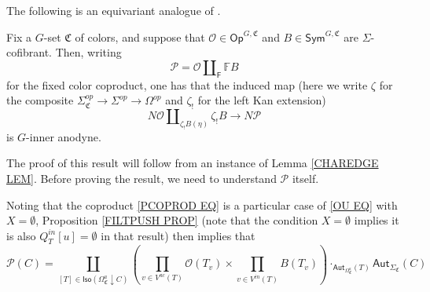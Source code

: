 \documentclass[a4paper,10pt
,draft
]{article}%
\renewcommand{\1}{\eta}%
\begin{document}
The following is an equivariant analogue of \cite[Prop. 3.2]{CM13b}.

\begin{proposition}\label{KEYPR PROP}
Fix a $G$-set $\mathfrak{C}$ of colors,
and suppose that 
$\mathcal{O} \in \mathsf{Op}^{G,\mathfrak{C}}$
and
$B \in \mathsf{Sym}^{G,\mathfrak{C}}$
are
$\Sigma$-cofibrant.
Then, writing
\begin{equation}\label{PCOPROD EQ}
\mathcal{P} = \mathcal{O} \amalg_{\mathsf{F}} \mathbb{F} B
\end{equation}
for the fixed color coproduct, 
one has that the induced map
(here we write $\zeta$ for the composite
$\Sigma_{\mathfrak{C}}^{op} \to \Sigma^{op} \to \Omega^{op}$
and $\zeta_!$ for the left Kan extension)
\begin{equation}\label{ANODYNEMAP EQ}
N \mathcal{O} \amalg_{\zeta_!B (\eta)} \zeta_!B \to N \mathcal{P}
\end{equation}
is $G$-inner anodyne.
%
\end{proposition}


The proof of this result will follow from an instance of 
Lemma \ref{CHAREDGE LEM}. 
Before proving the result, we need to understand $\mathcal{P}$ itself.

Noting that the coproduct \eqref{PCOPROD EQ}
is a particular case of \eqref{OU EQ} with $X=\emptyset$,
Proposition \ref{FILTPUSH PROP}
(note that the condition $X=\emptyset$ implies it is also 
$Q^{in}_T[u] = \emptyset$ in that result)
then implies that  
\begin{equation}\label{PUSHOPPR EQ}
	\mathcal{P}(C) = 
	\coprod_{
	[T] \in \mathsf{Iso}
	\left( \Omega_{\mathfrak{C}}^a \downarrow C \right)
	}
	\left(
		\prod_{v \in V^{ac}(T)} \mathcal{O}(T_v)
	\times
		\prod_{v \in V^{in}(T)} B(T_v)
	\right)
	\cdot_{\mathsf{Aut}_{\Omega^a_{\mathfrak{C}}}(T)} \mathsf{Aut}_{\Sigma_{\mathfrak{C}}}(C)
\end{equation}
\end{document}

